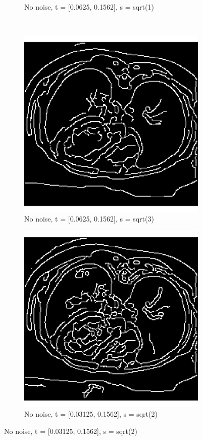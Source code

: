 \begin{figure}[H]
\begin{subfigure}{.5\textwidth}
    \caption{No noise, t = [0.0625, 0.1562], s = sqrt(1)}
    \label{fig:cany_no_noise_low_s}
  \end{subfigure}\\%
  \begin{subfigure}{.5\textwidth}
    \centering
    \includegraphics[width=.9\textwidth]{./canny1/no_noise_s_srt_3}
    \caption{No noise, t = [0.0625, 0.1562], s = sqrt(3)}
    \label{fig:cany_no_noise_high_s}
  \end{subfigure}%
  \begin{subfigure}{.5\textwidth}
    \centering
    \includegraphics[width=.9\textwidth]{./canny1/no_noise_t_003125_01562}
    \caption{No noise, t = [0.03125, 0.1562], s = sqrt(2)}
    \label{fig:cany_no_noise_low_low_t}
  \end{subfigure}%
  
\end{figure}


